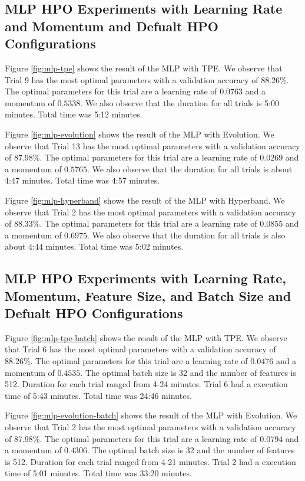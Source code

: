 \documentclass{article}
\begin{document}
\subsection{MLP HPO Experiments with Learning Rate and Momentum and Defualt HPO Configurations}
Figure \ref{fig:mlp-tpe} shows the result of the MLP with TPE. We observe that Trial 9 has the most optimal parameters with a validation accuracy of 88.26\%. The optimal parameters for this trial are a learning rate of $0.0763$ and a momentum of $0.5338$. We also observe that the duration for all trials is 5:00 minutes. Total time was 5:12 minutes.

Figure \ref{fig:mlp-evolution} shows the result of the MLP with Evolution. We observe that Trial 13 has the most optimal parameters with a validation accuracy of 87.98\%. The optimal parameters for this trial are a learning rate of $0.0269$ and a momentum of $0.5765$. We also observe that the duration for all trials is about 4:47 minutes. Total time was 4:57 minutes.

Figure \ref{fig:mlp-hyperband} shows the result of the MLP with Hyperband. We observe that Trial 2 has the most optimal parameters with a validation accuracy of 88.33\%. The optimal parameters for this trial are a learning rate of $0.0855$ and a momentum of $0.6975$. We also observe that the duration for all trials is also about 4:44 minutes. Total time was 5:02 minutes.

\subsection{MLP HPO Experiments with Learning Rate, Momentum, Feature Size, and Batch Size and Defualt HPO Configurations}
Figure \ref{fig:mlp-tpe-batch} shows the result of the MLP with TPE. We observe that Trial 6 has the most optimal parameters with a validation accuracy of 88.26\%. The optimal parameters for this trial are a learning rate of $0.0476$ and a momentum of $0.4535$. The optimal batch size is 32 and the number of features is 512. Duration for each trial ranged from 4-24 minutes. Trial 6 had a execution time of 5:43 minutes. Total time was 24:46 minutes.

Figure \ref{fig:mlp-evolution-batch} shows the result of the MLP with Evolution. We observe that Trial 2 has the most optimal parameters with a validation accuracy of 87.98\%. The optimal parameters for this trial are a learning rate of $0.0794$ and a momentum of $0.4306$. The optimal batch size is 32 and the number of features is 512. Duration for each trial ranged from 4-21 minutes. Trial 2 had a execution time of 5:01 minutes. Total time was 33:20 minutes.
\end{document}
